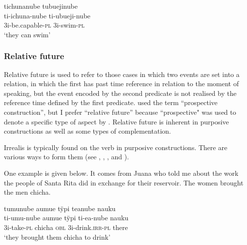\ea\label{ex:ABIL-REAL}
\begingl
\glpreamble tichunanube tubuejinube\\
\gla ti-ichuna-nube ti-ubueji-nube\\
\glb 3i-be.capable-\textsc{pl} 3i-swim-\textsc{pl}\\
\glft ‘they can swim’
\endgl
 \trailingcitation{[jxx-a120516l-a.570]}
\xe
{}

\subsubsection{Relative future}\label{sec:Prospectiveness}

Relative future is used to refer to those cases in which two events are set into a relation, in which the first has past time reference in relation to the moment of speaking, but the event encoded by the second predicate is not realised by the reference time defined by the first predicate. \citet[]{Michael2014} used the term “prospective construction”, but I prefer “relative future” because “prospective" was used to denote a specific type of aspect by \citet[64]{Comrie1976}. Relative future is inherent in purposive constructions as well as some types of complementation.

Irrealis is typically found on the  verb in purposive constructions. There are various ways to form them (see , , , and ).

One example is given below. It comes from Juana who told me about the work the people of Santa Rita did in exchange for their reservoir. The women brought the men chicha.

\ea\label{ex:irr-purpi-1}
\begingl
\glpreamble tumunube aumue tÿpi teanube nauku\\
\gla ti-umu-nube aumue tÿpi ti-ea-nube nauku\\
\glb 3i-take-\textsc{pl} chicha \textsc{obl} 3i-drink.\textsc{irr}-\textsc{pl} there\\
\glft ‘they brought them chicha to drink’
\endgl
 \trailingcitation{[jxx-p120515l-2.183-184]}
\xe
{}

